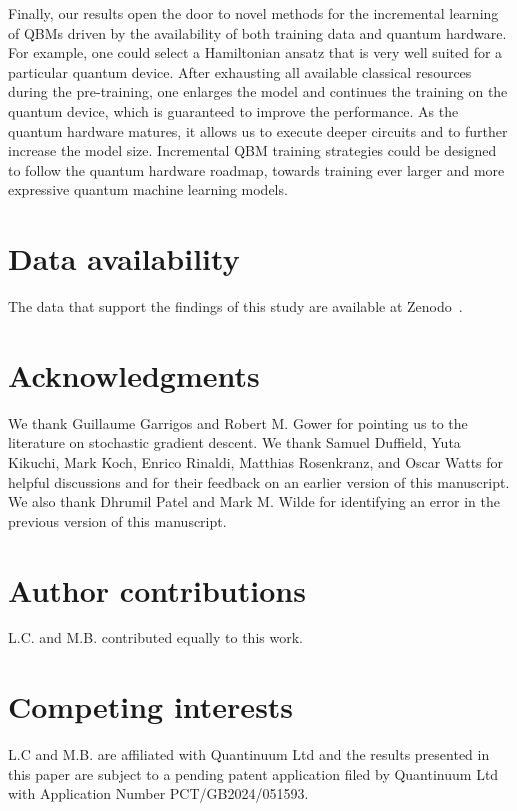 \documentclass[
    reprint,
    aps,
    prx,
    longbibliography
]{revtex4-2}
\begin{document}
Finally, our results open the door to novel methods for the incremental learning of QBMs driven by the availability of both training data and quantum hardware. For example, one could select a Hamiltonian ansatz that is very well suited for a particular quantum device. After exhausting all available classical resources during the pre-training, one enlarges the model and continues the training on the quantum device, which is guaranteed to improve the performance. As the quantum hardware matures, it allows us to execute deeper circuits and to further increase the model size. Incremental QBM training strategies could be designed to follow the quantum hardware roadmap, towards training ever larger and more expressive quantum machine learning models.

\newpage

\section*{Data availability}
The data that support the findings of this study are available at Zenodo~\cite{zenodo_files}.

\section*{Acknowledgments}
We thank Guillaume Garrigos and Robert M. Gower for pointing us to the literature on stochastic gradient descent. We thank Samuel Duffield, Yuta Kikuchi, Mark Koch, Enrico Rinaldi, Matthias Rosenkranz, and Oscar Watts for helpful discussions and for their feedback on an earlier version of this manuscript. We also thank Dhrumil Patel and Mark M. Wilde for identifying an error in the previous version of this manuscript.

\section*{Author contributions}
L.C. and M.B. contributed equally to this work.

\section*{Competing interests}
L.C and M.B. are affiliated with Quantinuum Ltd and the results presented in this paper are subject to a pending patent application filed by Quantinuum Ltd with Application Number PCT/GB2024/051593.

\let\oldaddcontentsline\addcontentsline
\renewcommand{\addcontentsline}[3]{}

\let\addcontentsline\oldaddcontentsline
\end{document}
